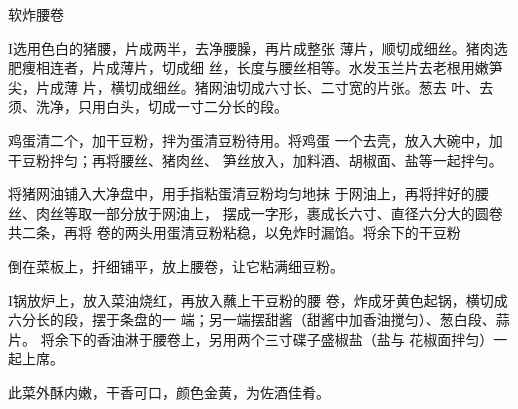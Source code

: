\begin{recipe}{软炸腰卷}

\ingredients



\cooking

I选用色白的猪腰，片成两半，去净腰臊，再片成整张 薄片，顺切成细丝。猪肉选肥痩相连者，片成薄片，切成细 丝，长度与腰丝相等。水发玉兰片去老根用嫩笋尖，片成薄 片，横切成细丝。猪网油切成六寸长、二寸宽的片张。葱去 叶、去须、洗净，只用白头，切成一寸二分长的段。

\step 	鸡蛋清二个，加干豆粉，拌为蛋清豆粉待用。将鸡蛋 一个去壳，放入大碗中，加干豆粉拌匀；再将腰丝、猪肉丝、 笋丝放入，加料酒、胡椒面、盐等一起拌勻。

\step 	将猪网油铺入大净盘中，用手指粘蛋清豆粉均匀地抹 于网油上，再将拌好的腰丝、肉丝等取一部分放于网油上， 摆成一字形，裹成长六寸、直径六分大的圆卷共二条，再将 卷的两头用蛋清豆粉粘稳，以免炸时漏馅。将余下的干豆粉

倒在菜板上，扞细铺平，放上腰卷，让它粘满细豆粉。

I锅放炉上，放入菜油烧红，再放入蘸上干豆粉的腰 卷，炸成牙黄色起锅，横切成六分长的段，摆于条盘的一 端；另一端摆甜酱（甜酱中加香油搅匀）、葱白段、蒜片。 将余下的香油淋于腰卷上，另用两个三寸碟子盛椒盐（盐与 花椒面拌匀）一起上席。

\notes

此菜外酥内嫩，干香可口，颜色金黄，为佐酒佳肴。

\end{recipe}

